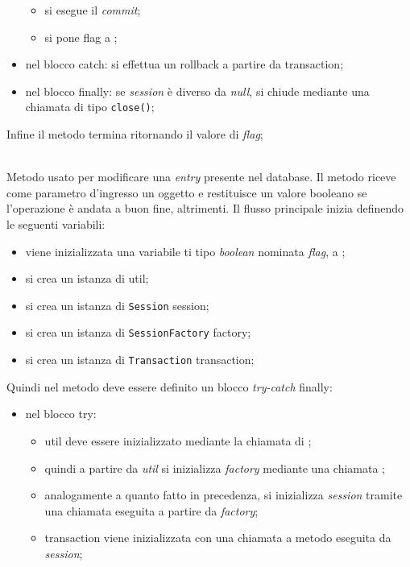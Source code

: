 \begin{description}
\begin{itemize}
\begin{itemize}
			\item si esegue il \textit{commit};
			\item si pone flag a ;
		\end{itemize}
		\item nel blocco catch: si effettua un rollback a partire da transaction;
		\item nel blocco finally: se \textit{session} è diverso da \textit{null}, si chiude mediante una chiamata di tipo \texttt{close()};
	\end{itemize}
	Infine il metodo termina ritornando il valore di \textit{flag};
	
	\item{}\\
	Metodo usato per modificare una \textit{entry} presente nel database. Il metodo riceve come parametro d'ingresso un oggetto  e restituisce un valore booleano  se l'operazione è andata a buon fine,  altrimenti. Il flusso principale inizia definendo le seguenti variabili:
	\begin{itemize}
		\item viene inizializzata una variabile ti tipo \textit{boolean} nominata \textit{flag}, a ;
		\item si crea un istanza di  util;
		\item si crea un istanza di \texttt{Session} session;
		\item si crea un istanza di \texttt{SessionFactory} factory;
		\item si crea un istanza di \texttt{Transaction} transaction;
	\end{itemize}
	Quindi nel metodo deve essere definito un blocco \textit{try-catch} finally:
	\begin{itemize}
		\item nel blocco try:
		\begin{itemize}
			\item util deve essere inizializzato mediante la chiamata  di ;
			\item quindi a partire da \textit{util} si inizializza \textit{factory} mediante una chiamata ;
			\item analogamente a quanto fatto in precedenza, si inizializza \textit{session} tramite una chiamata  eseguita a partire da \textit{factory};
			\item transaction viene inizializzata con una chiamata a metodo  eseguita da \textit{session};

\end{itemize}
\end{itemize}
\end{description}
